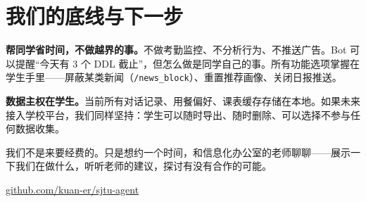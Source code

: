 \documentclass[11pt,a4paper]{ctexart}
\begin{document}
\section{我们的底线与下一步}

\textbf{帮同学省时间，不做越界的事。}不做考勤监控、不分析行为、不推送广告。Bot 可以提醒“今天有 3 个 DDL 截止”，但怎么做是同学自己的事。所有功能选项掌握在学生手里——屏蔽某类新闻（\texttt{/news\_block}）、重置推荐画像、关闭日报推送。

\textbf{数据主权在学生。}当前所有对话记录、用餐偏好、课表缓存存储在本地。如果未来接入学校平台，我们同样坚持：学生可以随时导出、随时删除、可以选择不参与任何数据收集。

我们不是来要经费的。只是想约一个时间，和信息化办公室的老师聊聊——展示一下我们在做什么，听听老师的建议，探讨有没有合作的可能。

\vspace{0.5em}
\begin{center}
\href{https://github.com/kuan-er/sjtu-agent}{github.com/kuan-er/sjtu-agent}
\end{center}
\end{document}
